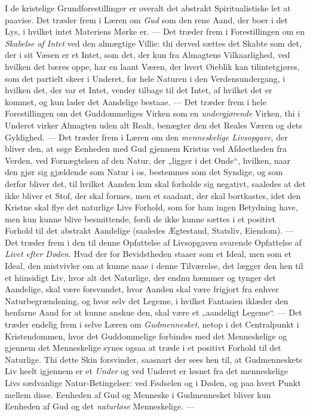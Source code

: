 \documentclass[12pt,a4paper,openany]{book}
\newcommand{\opage}[1]{\marginnote{\footnotesize\textit{[#1]}}}
\begin{document}
I de kristelige Grundforestillinger er overalt det abstrakt
Spiritualistiske let at paavise. Det træder frem i Læren
om \emph{Gud} som den rene Aand, der boer i det Lys, i hvilket
intet Materiens Mørke er. --- Det træder frem i Forestillingen
om en \emph{Skabelse af Intet} ved den almægtige Villie:
thi derved sættes det Skabte som det, der i sit Væsen er et
Intet, som det, der kun fra Almagtens Vilkaarlighed, ved
hvilken det bæres oppe, har en laant Væren, der hvert
Øieblik kan tilintetgjøres, som det partielt skeer i Underet, for
hele Naturen i den Verdensundergang, i hvilken det, der
\opage{450}var et Intet, vender tilbage til det Intet, af hvilket det er
kommet, og kun lader det Aandelige bestaae. --- Det træder
frem i hele Forestillingen om det Guddommeliges Virken
som en \emph{undergjørende} Virken, thi i Underet virker Almagten
uden alt Realt, benægter den det Reales Væren og dets
Gyldighed. --- Det træder frem i Læren om den \emph{menneskelige
Livsopgave}, der bliver den, at søge Eenheden med Gud
gjennem Kristus ved Afdøetheden fra Verden, ved Fornægtelsen
af den Natur, der „ligger i det Onde“, hvilken, naar
den gjør sig gjældende som Natur i os, bestemmes som det Syndige,
og som derfor bliver det, til hvilket Aanden kun skal forholde
sig negativt, saaledes at det ikke bliver et Stof, der
skal formes, men et saadant, der skal bortkastes, idet den
Kristne skal flye det naturlige Livs Forhold, som for ham
ingen Betydning have, men kun kunne blive besmittende,
fordi de ikke kunne sættes i et positivt Forhold til det abstrakt
Aandelige (saaledes Ægtestand, Statsliv, Eiendom). ---
Det træder frem i den til denne Opfattelse af Livsopgaven
svarende Opfattelse af \emph{Livet efter Døden}. Hvad der for
Bevidstheden staaer som et Ideal, men som et Ideal, den
mistvivler om at kunne naae i denne Tilværelse, det lægger
den hen til et hiinsidigt Liv, hvor alt det Naturlige, der
endnu hæmmer og tynger det Aandelige, skal være forsvundet,
hvor Aanden skal være frigjort fra enhver Naturbegrændsning,
og hvor selv det Legeme, i hvilket Fantasien iklæder den
henfarne Aand for at kunne anskue den, skal være et „aandeligt
Legeme“. --- Det træder endelig frem i selve Læren om \emph{Gudmennesket},
netop i det Centralpunkt i Kristendommen,
hvor det Guddommelige forbindes med det Menneskelige og
gjennem det Menneskelige synes ogsaa at træde i et positivt
Forhold til det Naturlige. Thi dette Skin forsvinder, saasnart
der sees hen til, at Gudmenneskets Liv heelt igjennem
er et \emph{Under} og ved Underet er løsnet fra det menneskelige
Livs sædvanlige Natur-Betingelser: ved Fødselen og i Døden,
og paa hvert Punkt mellem disse. Eenheden af Gud og
\opage{451}Menneske i Gudmennesket bliver kun Eenheden af Gud og
det \emph{naturløse} Menneskelige. ---
\end{document}
